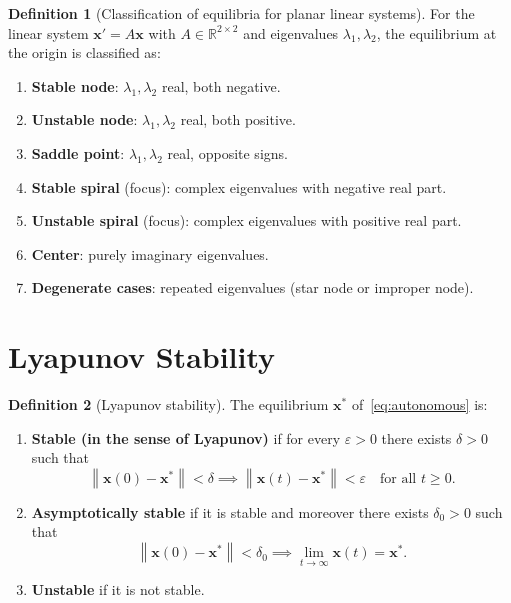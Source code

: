 \documentclass[12pt,a4paper,openany]{book}
\theoremstyle{definition}
\newtheorem{definition}{Definition}[chapter]
\theoremstyle{plain}
\theoremstyle{remark}
\newcommand{\R}{\mathbb{R}}
\newcommand{\norm}[1]{\left\|#1\right\|}
\begin{document}
\begin{definition}[Classification of equilibria for planar linear systems]
\label{def:equilibrium-classification}
For the linear system \(\mathbf{x}'=A\mathbf{x}\) with \(A\in\R^{2\times 2}\)
and eigenvalues \(\lambda_1,\lambda_2\), the equilibrium at the origin is
classified as:
\begin{enumerate}[label=(\roman*)]
  \item \textbf{Stable node}: \(\lambda_1,\lambda_2\) real,
    both negative.
  \item \textbf{Unstable node}: \(\lambda_1,\lambda_2\)
    real, both positive.
  \item \textbf{Saddle point}: \(\lambda_1,\lambda_2\) real,
    opposite signs.
  \item \textbf{Stable spiral} (focus): complex eigenvalues
    with negative real part.
  \item \textbf{Unstable spiral} (focus): complex
    eigenvalues with positive real part.
  \item \textbf{Center}: purely imaginary eigenvalues.
  \item \textbf{Degenerate cases}: repeated eigenvalues (star node or
    improper node).
\end{enumerate}
\end{definition}

\section{Lyapunov Stability}
\label{sec:lyapunov-stability}

\begin{definition}[Lyapunov stability]
\label{def:lyapunov-stability}
The equilibrium \(\mathbf{x}^*\) of~\eqref{eq:autonomous} is:
\begin{enumerate}[label=(\roman*)]
  \item \textbf{Stable (in the sense of Lyapunov)}
    if for every \(\varepsilon>0\) there exists \(\delta>0\) such that
    \[
      \norm{\mathbf{x}(0)-\mathbf{x}^*}<\delta
      \implies \norm{\mathbf{x}(t)-\mathbf{x}^*}<\varepsilon
      \quad\text{for all } t\ge 0.
    \]
  \item \textbf{Asymptotically stable} if it is
    stable and moreover there exists \(\delta_0>0\) such that
    \[
      \norm{\mathbf{x}(0)-\mathbf{x}^*}<\delta_0
      \implies \lim_{t\to\infty}\mathbf{x}(t)=\mathbf{x}^*.
    \]
  \item \textbf{Unstable} if it is not stable.
\end{enumerate}
\end{definition}
\end{document}
